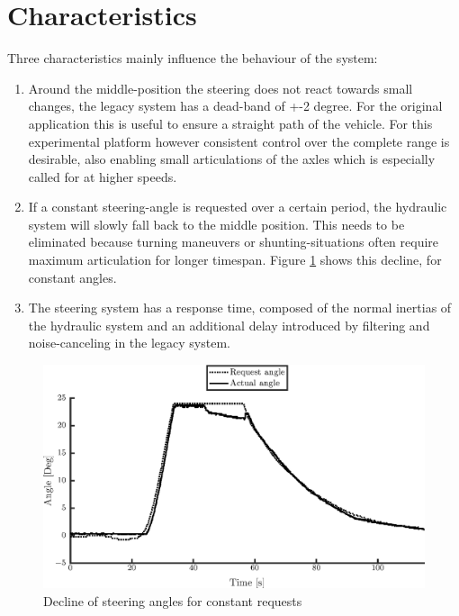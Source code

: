\documentclass[root.tex]{subfiles}
\begin{document}
	
	{\pagestyle{empty}}
	\section{Characteristics}
	\label{chap:Delays}
	
	Three characteristics mainly influence the behaviour of the system: 
	
	\begin{enumerate}
		\item Around the middle-position the steering does not react towards small changes, the legacy system has a dead-band of +-2 degree. For the original application this is useful to ensure a straight path of the vehicle. For this experimental platform however consistent control over the complete range is desirable, also enabling small articulations of the axles which is especially called for at higher speeds. 
		\item If a constant steering-angle is requested over a certain period, the hydraulic system will slowly fall back to the middle position. This needs to be eliminated because turning maneuvers or shunting-situations often require maximum articulation for longer timespan. Figure \ref{fig:Constant_request} shows this decline, for constant angles.
		\item The steering system has a response time, composed of the normal inertias of the hydraulic system and an additional delay introduced by filtering and noise-canceling in the legacy system. 
		
	\end{enumerate}
	
	\begin{figure}[!h]
		
		\includegraphics[width=1\linewidth]{front}
		\caption[Decline of steering angles for constant requests]{Decline of steering angles for constant requests}
		
		\label{fig:Constant_request}
	\end{figure}
	
\end{document}
